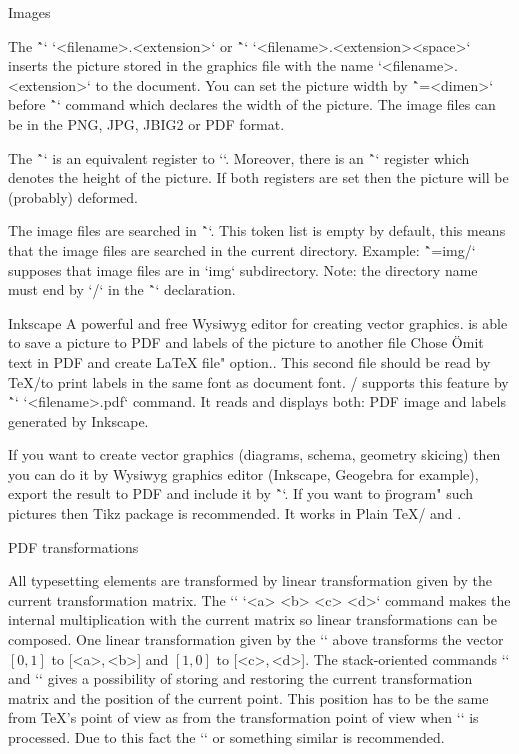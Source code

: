 {\secc Images

The \^`\inspic` `{<filename>.<extension>}` or
\^`\inspic` `<filename>.<extension><space>`
inserts the picture stored in
the graphics file with the name `<filename>.<extension>` to the document.
You can set the picture width by \^`\picw=<dimen>`
before \^`\inspic` command which declares the width of the picture.
The image files can be in the PNG, JPG, JBIG2 or PDF format.

The \^`\picwidth` is an equivalent register to `\picw`. Moreover, there is an
\^`\picheight` register which denotes the height of the picture. If both
registers are set then the picture will be (probably) deformed.

The image files are searched in \^`\picdir`. This token list is empty
by default, this means that the image files are searched in the
current directory. Example: \^`\picdir={img/}` supposes that image files are
in `img` subdirectory. Note: the directory name must end by `/` in
the \^`\picdir` declaration.

Inkscape\fnote
{A powerful and free Wysiwyg editor for creating vector graphics.}
is able to save a picture to PDF and labels of the picture to another
file\fnote
{Chose \"Omit text in PDF and create LaTeX file" option.}.
This second file should be read by \TeX/to print labels
in the same font as document font. \OpTeX/ supports this feature by
\^`\inkinspic` `{<filename>.pdf}` command. It reads and displays
both: PDF image and labels generated by Inkscape.

If you want to create vector graphics (diagrams, schema, geometry
skicing) then you can do it by Wysiwyg graphics editor (Inkscape, Geogebra for
example), export the result to PDF and include it by \^`\inspic`.
If you want to \"program" such pictures then Tikz package is recommended.
It works in Plain \TeX/ and \OpTeX.

\secc PDF transformations

All typesetting elements are transformed by linear
transformation given by the current transformation matrix. The
`\pdfsetmatrix` `{<a> <b> <c> <d>}` command makes the internal multiplication
with the current matrix so linear transformations can be composed.
One linear transformation given by the `\pdfsetmatrix` above transforms
the vector $[0,1]$ to [<a>,\,<b>] and $[1,0]$ to [<c>,\,<d>].
The stack-oriented commands `\pdfsave` and `\pdfrestore` gives a possibility of
storing and restoring the current transformation matrix and the position of the current point.
This position has to be the same from \TeX{}'s point of
view as from the transformation point of view when `\pdfrestore` is processed.
Due to this fact the `\pdfsave{}\pdfrestore`
or something similar is recommended.

}

